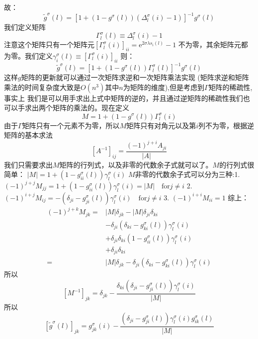 \documentclass[UTF8,cs4size]{ctexart}
\def\ee{\mathrm e}
\begin{document}
故：
\[
    \tilde{g}^{\sigma} (l) 
    =   \left[1 + 
            \left( 1 - g^{\sigma} (l) \right) \left(\Delta^{\sigma}_{l} (i) - 1 \right)
        \right] ^{-1}
        g^{\sigma}(l)
\]
我们定义矩阵
\[
    \Gamma_{l}^{\sigma} (l) \equiv \Delta^{\sigma}_{l} (i) - 1
\]
注意这个矩阵只有一个矩阵元$[\Gamma_{l}^{\sigma}(i)]_{ii} = \ee^{2\sigma \lambda s_{i}(l)}-1$
不为零，其余矩阵元都为零。我们定义$\gamma_{i}^{\sigma}(l) \equiv [\Gamma_{l}^{\sigma}(i)]_{ii}$
则：
\[
    \tilde{g}^{\sigma} (l) 
    =   \left[1 + 
            \left( 1 - g^{\sigma} (l) \right) \Gamma_{l}^{\sigma} (l)
        \right] ^{-1}
        g^{\sigma}(l)
\]
这样$g$矩阵的更新就可以通过一次矩阵求逆和一次矩阵乘法实现
(矩阵求逆和矩阵乘法的时间复杂度大致是$O(n^3)$其中$n$为矩阵的维度),但是考虑到$\Gamma$矩阵的稀疏性,事实上
我们是可以用手求出上式中矩阵的逆的，并且通过逆矩阵的稀疏性我们也可以手求出两个矩阵的乘法的。现在定义
\[
    M = 1 + \left( 1 - g^{\sigma} (l) \right) \Gamma_{l}^{\sigma} (i)
\]
由于$\Gamma$矩阵只有一个元素不为零，所以$M$矩阵只有对角元以及第$i$列不为零，根据逆矩阵的基本求法
\[
    [A^{-1}]_{ij} = \frac{(-1)^{j + i}A_{ji}}{|A|}
\]
我们只需要求出$M$矩阵的行列式，以及非零的代数余子式就可以了。$M$的行列式很简单：
$|M| = 1 + (1 - g_{ii}^{\sigma} (l)) \gamma_{l}^{\sigma}(i)$
$M$非零的代数余子式可以分为三种:1.
$(-1)^{j + j} M_{jj} = 1 + (1 - g_{ii}^{\sigma} (l)) \gamma_{l}^{\sigma}(i) = |M|
    \quad \mathrm{for} j \neq i$
2.
$(-1)^{i + j} M_{ij} = -(\delta_{ji} - g_{ji}^{\sigma}(l)) \gamma^{\sigma}_{l}(i)
\quad \mathrm{for} j \neq i$ 3. $(-1)^{i+i}M_{ii} = 1$ 
综上：
\[
    \begin{aligned}
        (-1)^{j + k} M_{jk}=& |M|\delta_{jk} - |M|\delta_{ji}\delta_{ki}\\
            & - \delta_{ji} (\delta_{ki} - g_{ki}^{\sigma}(l)) \gamma_{l}^{\sigma}(i)\\
            & + \delta_{ji} \delta_{ki}(1 - g_{ii}^{\sigma}(l)) \gamma_{l}^{\sigma}(i)\\
            &+\delta_{ji}\delta_{ki}\\
            =& |M|\delta_{jk} - \delta_{ji} (\delta_{ki} - g_{ki}^{\sigma}(l)) \gamma_{l}^{\sigma}(i)
    \end{aligned}
\]
所以
\[
    [M^{-1}]_{jk} = \delta_{jk} - \frac{\delta_{ki}(\delta_{ji} 
    - g_{ji}^{\sigma}(l))\gamma_{l}^{\sigma}(i)}{|M|}   
\]
所以
\[
    [\tilde{g}^{\sigma} (l)]_{jk} = g_{jk}^{\sigma}(i)
    - \frac{(\delta_{ji} 
    - g_{ji}^{\sigma}(l))\gamma_{l}^{\sigma}(i) g_{ik}^{\sigma}(l)}{|M|}
\]
\appendix
\end{document}
